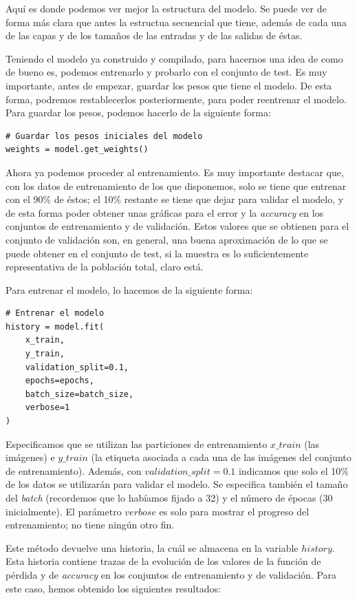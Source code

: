 \documentclass[11pt,a4paper]{article}
\begin{document}
Aquí es donde podemos ver mejor la estructura del modelo. Se puede ver de forma más clara que antes la estructua secuencial
que tiene, además de cada una de las capas y de los tamaños de las entradas y de las salidas de éstas.

Teniendo el modelo ya construido y compilado, para hacernos una idea de como de bueno es, podemos entrenarlo y probarlo
con el conjunto de test. Es muy importante, antes de empezar, guardar los pesos que tiene el modelo. De esta forma, podremos
restablecerlos posteriormente, para poder reentrenar el modelo. Para guardar los pesos, podemos hacerlo de la siguiente
forma:

\begin{lstlisting}
# Guardar los pesos iniciales del modelo
weights = model.get_weights()
\end{lstlisting}

Ahora ya podemos proceder al entrenamiento. Es muy importante destacar que, con los datos de entrenamiento de los que disponemos,
solo se tiene que entrenar con el 90\% de éstos; el 10\% restante se tiene que dejar para validar el modelo, y de esta forma poder
obtener unas gráficas para el error y la \textit{accuracy} en los conjuntos de entrenamiento y de validación. Estos
valores que se obtienen para el conjunto de validación son, en general, una buena aproximación de lo que se puede obtener
en el conjunto de test, si la muestra es lo suficientemente representativa de la población total, claro está.

Para entrenar el modelo, lo hacemos de la siguiente forma:

\begin{lstlisting}
# Entrenar el modelo
history = model.fit(
    x_train,
    y_train,
    validation_split=0.1,
    epochs=epochs,
    batch_size=batch_size,
    verbose=1
)
\end{lstlisting}

Especificamos que se utilizan las particiones de entrenamiento $x\_train$ (las imágenes) e $y\_train$ (la etiqueta asociada
a cada una de las imágenes del conjunto de entrenamiento). Además, con $validation\_split = 0.1$ indicamos que solo el
10\% de los datos se utilizarán para validar el modelo. Se especifica también el tamaño del \textit{batch} (recordemos que
lo habíamos fijado a 32) y el número de épocas (30 inicialmente). El parámetro $verbose$ es solo para mostrar el progreso
del entrenamiento; no tiene ningún otro fin.

Este método devuelve una historia, la cuál se almacena en la variable $history$. Esta historia contiene trazas de la evolución
de los valores de la función de pérdida y de \textit{accuracy} en los conjuntos de entrenamiento y de validación.
Para este caso, hemos obtenido los siguientes resultados:
\end{document}
